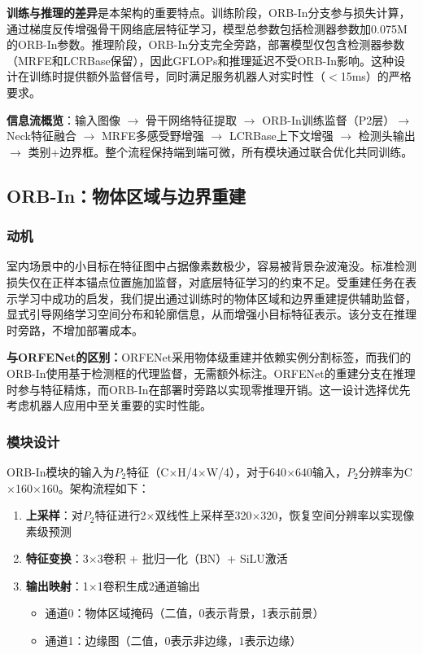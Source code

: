 \documentclass[journal]{IEEEtran}
\begin{document}
\textbf{训练与推理的差异}是本架构的重要特点。训练阶段，ORB-In分支参与损失计算，通过梯度反传增强骨干网络底层特征学习，模型总参数包括检测器参数加0.075M的ORB-In参数。推理阶段，ORB-In分支完全旁路，部署模型仅包含检测器参数（MRFE和LCRBase保留），因此GFLOPs和推理延迟不受ORB-In影响。这种设计在训练时提供额外监督信号，同时满足服务机器人对实时性（$<$15ms）的严格要求。

\textbf{信息流概览}：输入图像 $\rightarrow$ 骨干网络特征提取 $\rightarrow$ ORB-In训练监督（P2层）$\rightarrow$ Neck特征融合 $\rightarrow$ MRFE多感受野增强 $\rightarrow$ LCRBase上下文增强 $\rightarrow$ 检测头输出 $\rightarrow$ 类别+边界框。整个流程保持端到端可微，所有模块通过联合优化共同训练。


\subsection{ORB-In：物体区域与边界重建}
\label{subsec:orb_in}

\subsubsection{动机}

室内场景中的小目标在特征图中占据像素数极少，容易被背景杂波淹没。标准检测损失仅在正样本锚点位置施加监督，对底层特征学习的约束不足。受重建任务在表示学习中成功的启发，我们提出通过训练时的物体区域和边界重建提供辅助监督，显式引导网络学习空间分布和轮廓信息，从而增强小目标特征表示。该分支在推理时旁路，不增加部署成本。

\textbf{与ORFENet的区别：}ORFENet采用物体级重建并依赖实例分割标签，而我们的ORB-In使用基于检测框的代理监督，无需额外标注。ORFENet的重建分支在推理时参与特征精炼，而ORB-In在部署时旁路以实现零推理开销。这一设计选择优先考虑机器人应用中至关重要的实时性能。

\subsubsection{模块设计}

ORB-In模块的输入为$P_2$特征（C$\times$H/4$\times$W/4），对于640$\times$640输入，$P_2$分辨率为C$\times$160$\times$160。架构流程如下：

\begin{enumerate}
    \item \textbf{上采样}：对$P_2$特征进行2$\times$双线性上采样至320$\times$320，恢复空间分辨率以实现像素级预测
    \item \textbf{特征变换}：3$\times$3卷积 + 批归一化（BN）+ SiLU激活
    \item \textbf{输出映射}：1$\times$1卷积生成2通道输出
    \begin{itemize}
        \item 通道0：物体区域掩码（二值，0表示背景，1表示前景）
        \item 通道1：边缘图（二值，0表示非边缘，1表示边缘）
    \end{itemize}
\end{enumerate}
\end{document}

